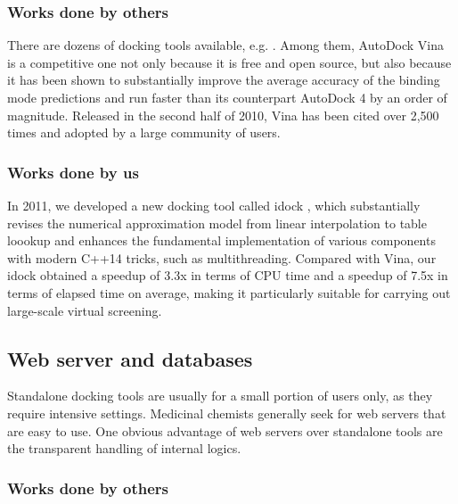 \documentclass[a4paper,12pt]{article}
\begin{document}
\subsubsection*{Works done by others}

There are dozens of docking tools available, e.g. \citep{595,607,617,650,596}. Among them, AutoDock Vina \citep{595} is a competitive one not only because it is free and open source, but also because it has been shown to substantially improve the average accuracy of the binding mode predictions \citep{595} and run faster than its counterpart AutoDock 4 \citep{596} by an order of magnitude. Released in the second half of 2010, Vina has been cited over 2,500 times and adopted by a large community of users.


\subsubsection*{Works done by us}

In 2011, we developed a new docking tool called idock \citep{1153}, which substantially revises the numerical approximation model from linear interpolation to table loookup and enhances the fundamental implementation of various components with modern C++14 tricks, such as multithreading. Compared with Vina, our idock obtained a speedup of 3.3x in terms of CPU time and a speedup of 7.5x in terms of elapsed time on average, making it particularly suitable for carrying out large-scale virtual screening.

\subsection*{Web server and databases}

Standalone docking tools are usually for a small portion of users only, as they require intensive settings. Medicinal chemists generally seek for web servers that are easy to use. One obvious advantage of web servers over standalone tools are the transparent handling of internal logics.

\subsubsection*{Works done by others}
\end{document}
